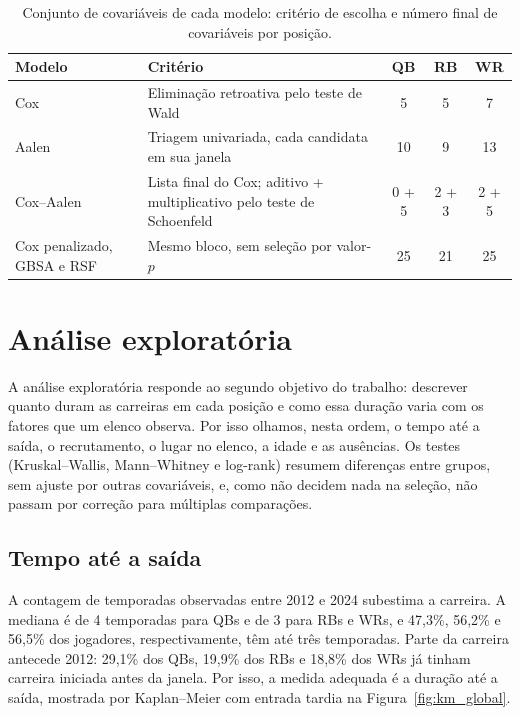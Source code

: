 \begin{table}[H]
\centering
\caption{Conjunto de covariáveis de cada modelo: critério de escolha e número final de covariáveis por posição.}
\label{tab:selecao_modelos}
\thesistablesetup
\begin{tabularx}{\textwidth}{@{}>{\raggedright\arraybackslash}p{2.9cm}Yccc@{}}
\toprule
\textbf{Modelo} & \textbf{Critério} & \textbf{QB} & \textbf{RB} & \textbf{WR} \\
\midrule
Cox & Eliminação retroativa pelo teste de Wald & 5 & 5 & 7 \\
\addlinespace
Aalen & Triagem univariada, cada candidata em sua janela & 10 & 9 & 13 \\
\addlinespace
Cox--Aalen & Lista final do Cox; aditivo + multiplicativo pelo teste de Schoenfeld & 0 + 5 & 2 + 3 & 2 + 5 \\
\addlinespace
Cox penalizado, GBSA e RSF & Mesmo bloco, sem seleção por valor-$p$ & 25 & 21 & 25 \\
\bottomrule
\end{tabularx}
\end{table}

\section{Análise exploratória}
\label{sec:eda}

A análise exploratória responde ao segundo objetivo do trabalho: descrever quanto duram as carreiras em cada posição e como essa duração varia com os fatores que um elenco observa. Por isso olhamos, nesta ordem, o tempo até a saída, o recrutamento, o lugar no elenco, a idade e as ausências. Os testes (Kruskal--Wallis, Mann--Whitney e log-rank) resumem diferenças entre grupos, sem ajuste por outras covariáveis, e, como não decidem nada na seleção, não passam por correção para múltiplas comparações.

\subsection{Tempo até a saída}
\label{sec:eda_saida}

A contagem de temporadas observadas entre 2012 e 2024 subestima a carreira. A mediana é de 4 temporadas para QBs e de 3 para RBs e WRs, e 47,3\%, 56,2\% e 56,5\% dos jogadores, respectivamente, têm até três temporadas. Parte da carreira antecede 2012: 29,1\% dos QBs, 19,9\% dos RBs e 18,8\% dos WRs já tinham carreira iniciada antes da janela. Por isso, a medida adequada é a duração até a saída, mostrada por Kaplan--Meier com entrada tardia na Figura~\ref{fig:km_global}.

